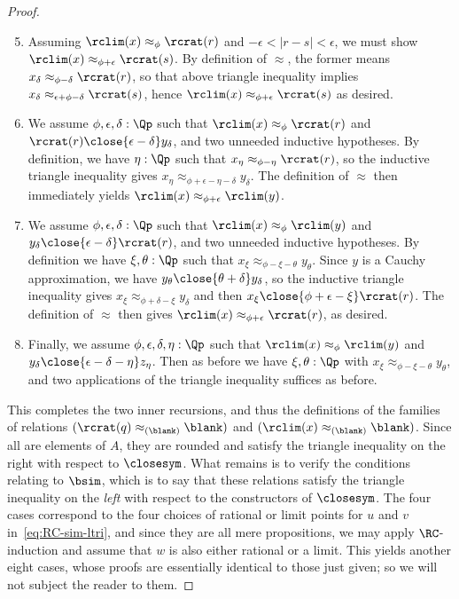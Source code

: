 \begin{proof}
  \begin{enumerate}\setcounter{enumi}{4}
  \item Assuming $\rclim(x)\approx_\phi \rcrat(r)$ and $-\epsilon<|r-s|<\epsilon$, we must show $\rclim(x)\approx_{\phi+\epsilon} \rcrat(s)$.
    By definition of $\approx$, the former means $x_\delta \approx_{\phi-\delta} \rcrat(r)$, so that above triangle inequality implies $x_\delta \approx_{\epsilon+\phi-\delta} \rcrat(s)$, hence $\rclim(x)\approx_{\phi+\epsilon} \rcrat(s)$ as desired.
  \item We assume $\phi,\epsilon,\delta:\Qp$ such that $\rclim(x)\approx_\phi \rcrat(r)$ and $\rcrat(r) \close{\epsilon-\delta} y_\delta$, and two unneeded inductive hypotheses.
    By definition, we have $\eta:\Qp$ such that $x_\eta \approx_{\phi-\eta} \rcrat(r)$, so the inductive triangle inequality gives $x_\eta \approx_{\phi+\epsilon-\eta-\delta} y_\delta$.
    The definition of $\approx$ then immediately yields $\rclim(x) \approx_{\phi+\epsilon} \rclim(y)$.
  \item We assume $\phi,\epsilon,\delta:\Qp$ such that $\rclim(x)\approx_\phi \rclim(y)$ and $y_\delta \close{\epsilon-\delta} \rcrat(r)$, and two unneeded inductive hypotheses.
    By definition we have $\xi,\theta:\Qp$ such that $x_\xi \approx_{\phi-\xi-\theta} y_\theta$.
    Since $y$ is a Cauchy approximation, we have $y_\theta \close{\theta+\delta} y_\delta$, so the inductive triangle inequality gives $x_\xi \approx_{\phi+\delta-\xi} y_\delta$ and then $x_\xi \close{\phi+\epsilon-\xi} \rcrat(r)$.
    The definition of $\approx$ then gives $\rclim(x) \approx_{\phi+\epsilon}\rcrat(r)$, as desired.
  \item Finally, we assume $\phi,\epsilon,\delta,\eta:\Qp$ such that $\rclim(x)\approx_\phi \rclim(y)$ and $y_\delta \close{\epsilon-\delta-\eta} z_\eta$.
    Then as before we have $\xi,\theta:\Qp$ with $x_\xi \approx_{\phi-\xi-\theta} y_\theta$, and two applications of the triangle inequality suffices as before.
  \end{enumerate}

  This completes the two inner recursions, and thus the definitions of the families of relations $(\rcrat(q)\approx_{(\blank)}\blank)$ and $(\rclim(x)\approx_{(\blank)}\blank)$.
  Since all are elements of $A$, they are rounded and satisfy the triangle inequality on the right with respect to $\closesym$.
  What remains is to verify the conditions relating to $\bsim$, which is to say that these relations satisfy the triangle inequality on the \emph{left} with respect to the constructors of $\closesym$.
  The four cases correspond to the four choices of rational or limit points for $u$ and $v$ in~\eqref{eq:RC-sim-ltri}, and since they are all mere propositions, we may apply $\RC$-induction and assume that $w$ is also either rational or a limit.
  This yields another eight cases, whose proofs are essentially identical to those just given; so we will not subject the reader to them.
\end{proof}
